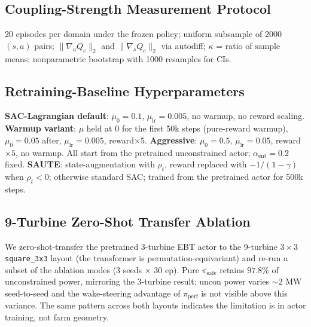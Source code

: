 \documentclass{article}
\begin{document}
\subsection{Coupling-Strength Measurement Protocol}
\label{app:coupling_protocol}

20 episodes per domain under the frozen policy; uniform subsample of 2000 $(s,a)$ pairs; $\|\nabla_a Q_c\|_2$ and $\|\nabla_s Q_c\|_2$ via autodiff; $\kappa$ = ratio of sample means; nonparametric bootstrap with 1000 resamples for CIs.

\subsection{Retraining-Baseline Hyperparameters}
\label{app:baselines}

\textbf{SAC-Lagrangian default}: $\mu_0\!=\!0.1$, $\mu_{\mathrm{lr}}\!=\!0.005$, no warmup, no reward scaling.
\textbf{Warmup variant}: $\mu$ held at 0 for the first $50$k steps (pure-reward warmup), $\mu_0\!=\!0.05$ after, $\mu_{\mathrm{lr}}\!=\!0.005$, reward$\times 5$.
\textbf{Aggressive}: $\mu_0\!=\!0.5$, $\mu_{\mathrm{lr}}\!=\!0.05$, reward$\times 5$, no warmup.
All start from the pretrained unconstrained actor; $\alpha_{\mathrm{ent}}\!=\!0.2$ fixed.
\textbf{SAUTE}: state-augmentation with $\rho_t$, reward replaced with $-1/(1-\gamma)$ when $\rho_t\!<\!0$; otherwise standard SAC; trained from the pretrained actor for 500k steps.

\subsection{9-Turbine Zero-Shot Transfer Ablation}
\label{app:wf_9turb}

We zero-shot-transfer the pretrained 3-turbine EBT actor to the 9-turbine $3\!\times\!3$ \texttt{square\_3x3} layout (the transformer is permutation-equivariant) and re-run a subset of the ablation modes (3 seeds $\times$ 30 ep). Pure $\pi_{\mathrm{safe}}$ retains $97.8\%$ of unconstrained power, mirroring the 3-turbine result; uncon power varies $\sim\!2$ MW seed-to-seed and the wake-steering advantage of $\pi_{\mathrm{perf}}$ is not visible above this variance. The same pattern across both layouts indicates the limitation is in actor training, not farm geometry.
\end{document}
